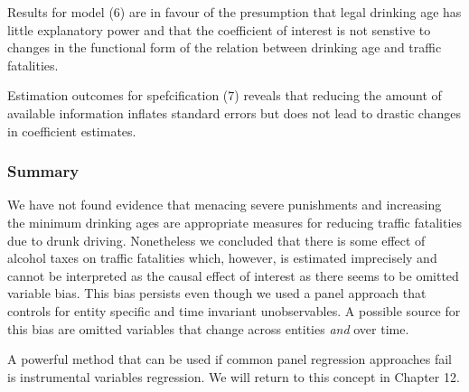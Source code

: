 \documentclass[]{book}
\theoremstyle{definition}
\theoremstyle{definition}
\theoremstyle{definition}
\theoremstyle{remark}
\begin{document}
Results for model (6) are in favour of the presumption that legal
drinking age has little explanatory power and that the coefficient of
interest is not senstive to changes in the functional form of the
relation between drinking age and traffic fatalities.

Estimation outcomes for spefcification (7) reveals that reducing the
amount of available information inflates standard errors but does not
lead to drastic changes in coefficient estimates.

\subsubsection*{Summary}\label{summary}

We have not found evidence that menacing severe punishments and
increasing the minimum drinking ages are appropriate measures for
reducing traffic fatalities due to drunk driving. Nonetheless we
concluded that there is some effect of alcohol taxes on traffic
fatalities which, however, is estimated imprecisely and cannot be
interpreted as the causal effect of interest as there seems to be
omitted variable bias. This bias persists even though we used a panel
approach that controls for entity specific and time invariant
unobservables. A possible source for this bias are omitted variables
that change across entities \emph{and} over time.

A powerful method that can be used if common panel regression approaches
fail is instrumental variables regression. We will return to this
concept in Chapter 12.


\end{document}
